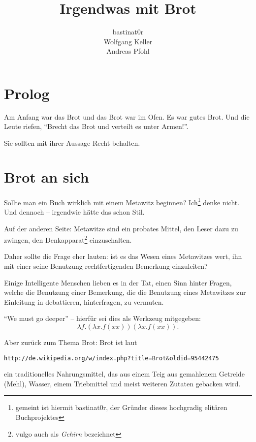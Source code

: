 \documentclass{scrbook}
\title{Irgendwas mit Brot}
\author{bastinat0r \\ Wolfgang Keller \\ Andreas Pfohl}
\begin{document}
\maketitle

\chapter*{Prolog}
Am Anfang war das Brot und das Brot war im Ofen. Es war gutes Brot. Und die Leute riefen, "`Brecht das Brot und verteilt es unter Armen!"'.

Sie sollten mit ihrer Aussage Recht behalten.

\chapter{Brot an sich}

Sollte man ein Buch wirklich mit einem Metawitz beginnen? Ich\footnote{gemeint ist hiermit bastinat0r, der Gründer dieses hochgradig elitären Buchprojektes} denke nicht. Und dennoch – irgendwie hätte das schon Stil.

Auf der anderen Seite: Metawitze sind ein probates Mittel, den Leser dazu zu zwingen, den Denkapparat\footnote{vulgo auch als \emph{Gehirn} bezeichnet} einzuschalten.

Daher sollte die Frage eher lauten: ist es das Wesen eines Metawitzes wert, ihn mit einer seine Benutzung rechtfertigenden Bemerkung einzuleiten?

Einige Intelligente Menschen lieben es in der Tat, einen Sinn hinter Fragen, welche die Benutzung einer Bemerkung, die die Benutzung eines Metawitzes zur Einleitung in debattieren, hinterfragen, zu vermuten.

"`We must go deeper"' -- hierfür sei dies als Werkzeug mitgegeben:
\begin{displaymath}
\lambda f.(\lambda x.f (x x)) (\lambda x.f (x x)).
\end{displaymath}
%

Aber zurück zum Thema Brot: Brot ist laut \begin{verbatim}http://de.wikipedia.org/w/index.php?title=Brot&oldid=95442475\end{verbatim} ein traditionelles Nahrungsmittel, das aus einem Teig aus gemahlenem Getreide (Mehl), Wasser, einem Triebmittel und meist weiteren Zutaten gebacken wird.
\end{document}
